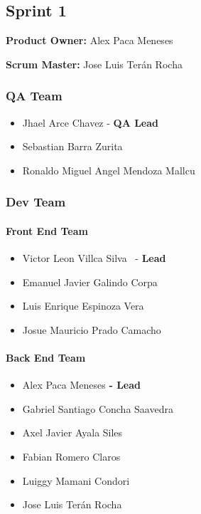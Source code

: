 \documentclass{article}
\providecommand{\tightlist}{
  \setlength{\itemsep}{0pt}\setlength{\parskip}{0pt}}
\begin{document}
\hypertarget{sprint1}{
\subsection{\texorpdfstring{\textbf{Sprint
1}}{Sprint 1}}\label{sprint1}}

\textbf{Product Owner: }
Alex Paca Meneses

\textbf{Scrum Master: }
Jose Luis Terán Rocha

\hypertarget{qateam-1}{
\subsubsection{\texorpdfstring{\textbf{QA Team}}{QA Team}}\label{qateam-1}}

\begin{itemize}
\tightlist
\item
  Jhael Arce Chavez - \textbf{QA Lead}
\item
  Sebastian Barra Zurita
\item
  Ronaldo Miguel Angel Mendoza Mallcu
\end{itemize}

\hypertarget{devteam-1}{
\subsubsection{\texorpdfstring{\textbf{Dev
Team}}{Dev Team}}\label{devteam-1}}

\paragraph{Front End Team}\label{front-end-team-1}

\begin{itemize}
\tightlist
\item
  Victor Leon Villca Silva ~- \textbf{Lead}
\item
  Emanuel Javier Galindo Corpa
\item
  Luis Enrique Espinoza Vera
\item
  Josue Mauricio Prado Camacho
\end{itemize}

\paragraph{Back End Team}\label{back-end-team-1}

\begin{itemize}
\tightlist
\item
  Alex Paca Meneses \textbf{- Lead}
\item
  Gabriel Santiago Concha Saavedra
\item
  Axel Javier Ayala Siles
\item
  Fabian Romero Claros
\item
  Luiggy Mamani Condori
\item
  Jose Luis Terán Rocha
\end{itemize}
\end{document}
